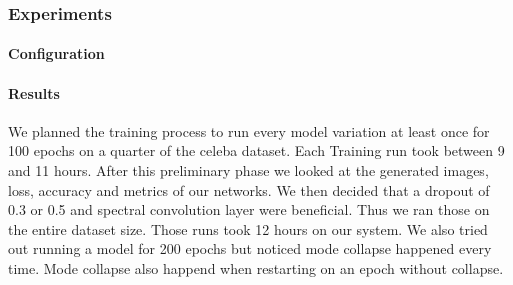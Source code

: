 \documentclass[12pt, a4paper]{article}
\begin{document}
\subsubsection{Experiments}
\paragraph{Configuration}
\paragraph{Results}
We planned the training process to run every model variation at least once for 100 epochs on a quarter of the celeba dataset. Each Training run took between 9 and 11 hours. After this preliminary phase we looked at the generated images, loss, accuracy and metrics of our networks. We then decided that a dropout of 0.3 or 0.5 and spectral convolution layer were beneficial. Thus we ran those on the entire dataset size. Those runs took 12 hours on our system. We also tried out running a model for 200 epochs but noticed mode collapse happened every time. Mode collapse also happend when restarting on an epoch without collapse.
\end{document}

